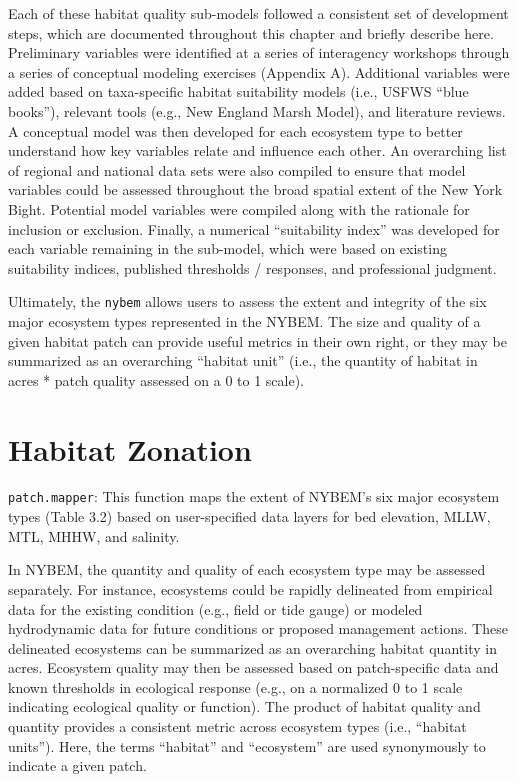 \documentclass[
]{book}
\begin{document}
Each of these habitat quality sub-models followed a consistent set of development steps, which are documented throughout this chapter and briefly describe here. Preliminary variables were identified at a series of interagency workshops through a series of conceptual modeling exercises (Appendix A). Additional variables were added based on taxa-specific habitat suitability models (i.e., USFWS ``blue books''), relevant tools (e.g., New England Marsh Model), and literature reviews. A conceptual model was then developed for each ecosystem type to better understand how key variables relate and influence each other. An overarching list of regional and national data sets were also compiled to ensure that model variables could be assessed throughout the broad spatial extent of the New York Bight. Potential model variables were compiled along with the rationale for inclusion or exclusion. Finally, a numerical ``suitability index'' was developed for each variable remaining in the sub-model, which were based on existing suitability indices, published thresholds / responses, and professional judgment.

Ultimately, the \texttt{nybem} allows users to assess the extent and integrity of the six major ecosystem types represented in the NYBEM. The size and quality of a given habitat patch can provide useful metrics in their own right, or they may be summarized as an overarching ``habitat unit'' (i.e., the quantity of habitat in acres * patch quality assessed on a 0 to 1 scale).

\hypertarget{habitat-zonation}{%
\section{Habitat Zonation}\label{habitat-zonation}}

\texttt{patch.mapper}: This function maps the extent of NYBEM's six major ecosystem types (Table 3.2) based on user-specified data layers for bed elevation, MLLW, MTL, MHHW, and salinity.

In NYBEM, the quantity and quality of each ecosystem type may be assessed separately. For instance, ecosystems could be rapidly delineated from empirical data for the existing condition (e.g., field or tide gauge) or modeled hydrodynamic data for future conditions or proposed management actions. These delineated ecosystems can be summarized as an overarching habitat quantity in acres. Ecosystem quality may then be assessed based on patch-specific data and known thresholds in ecological response (e.g., on a normalized 0 to 1 scale indicating ecological quality or function). The product of habitat quality and quantity provides a consistent metric across ecosystem types (i.e., ``habitat units''). Here, the terms ``habitat'' and ``ecosystem'' are used synonymously to indicate a given patch.
\end{document}
